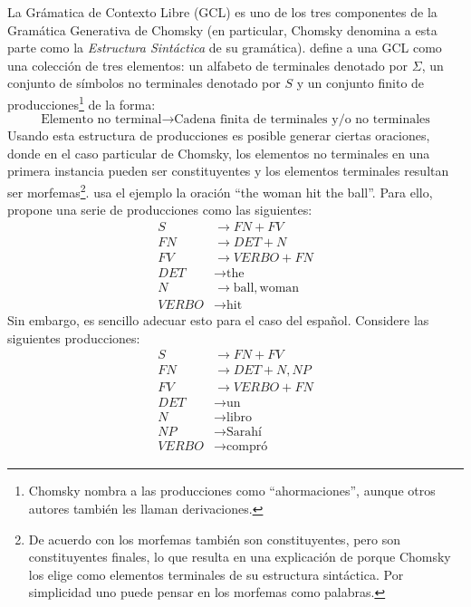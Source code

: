 La Grámatica de Contexto Libre (GCL) es uno de los tres componentes de la Gramática Generativa de Chomsky (en particular, Chomsky denomina a esta parte como la \textit{Estructura Sintáctica} de su gramática). \cite{cohen1991introduction} define a una GCL como una colección de tres elementos: un alfabeto de terminales denotado por $\Sigma$, un conjunto de símbolos no terminales denotado por $S$ y un conjunto finito de producciones\footnote{Chomsky nombra a las producciones como ``ahormaciones'', aunque otros autores también les llaman derivaciones.} de la forma:
\begin{displaymath}
	\mbox{Elemento no terminal} \rightarrow \mbox{Cadena finita de terminales y/o no terminales}
\end{displaymath}
Usando esta estructura de producciones es posible generar ciertas oraciones, donde en el caso particular de Chomsky, los elementos no terminales en una primera instancia pueden ser constituyentes y los elementos terminales resultan ser morfemas\footnote{De acuerdo con \cite{allerton1979essentials} los morfemas también son constituyentes, pero son constituyentes finales, lo que resulta en una explicación de porque Chomsky los elige como elementos terminales de su estructura sintáctica. Por simplicidad uno puede pensar en los morfemas como palabras.}. \cite{chomsky2004estructuras} usa el ejemplo la oración ``the woman hit the ball''. Para ello, propone una serie de producciones como las siguientes:
\begin{align*}
	S &\rightarrow FN + FV \\
	FN &\rightarrow DET + N \\
	FV &\rightarrow VERBO + FN \\
	DET &\rightarrow \mbox{the}\\
	N &\rightarrow \mbox{ball}, \mbox{woman}\\
	VERBO &\rightarrow \mbox{hit}
\end{align*}
Sin embargo, es sencillo adecuar esto para el caso del español. Considere las siguientes producciones:
\begin{align*}
	S &\rightarrow FN + FV \\
	FN &\rightarrow DET + N, NP \\
	FV &\rightarrow VERBO + FN \\
	DET &\rightarrow \mbox{un}\\
	N &\rightarrow \mbox{libro}\\
	NP &\rightarrow\mbox{Sarahí}\\
	VERBO &\rightarrow \mbox{compró}
\end{align*}

